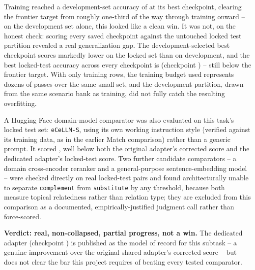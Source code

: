 \documentclass{article}
\newcommand{\code}[1]{\texttt{#1}}
\begin{document}
Training reached a development-set accuracy of \FunctionalAdapterDevBest{} at its best checkpoint, clearing the frontier target from roughly one-third of the way through training onward -- on the development set alone, this looked like a clean win. It was not, on the honest check: scoring every saved checkpoint against the untouched locked test partition revealed a real generalization gap. The development-selected best checkpoint scores markedly lower on the locked set than on development, and the best locked-test accuracy across every checkpoint is \FunctionalAdapterLockedBest{} (checkpoint \FunctionalAdapterBestCheckpoint{}) -- still below the frontier target. With only \FunctionalAdapterTrainRows{} training rows, the training budget used represents dozens of passes over the same small set, and the development partition, drawn from the same scenario bank as training, did not fully catch the resulting overfitting.

A Hugging Face domain-model comparator was also evaluated on this task's locked test set: \code{eCeLLM-S}, using its own working instruction style (verified against its training data, as in the earlier Match comparison) rather than a generic prompt. It scored \FunctionalEcellmLockedAcc{}, well below both the original adapter's corrected score and the dedicated adapter's locked-test score. Two further candidate comparators -- a domain cross-encoder reranker and a general-purpose sentence-embedding model -- were checked directly on real locked-test pairs and found architecturally unable to separate \code{complement} from \code{substitute} by any threshold, because both measure topical relatedness rather than relation type; they are excluded from this comparison as a documented, empirically-justified judgment call rather than force-scored.

\textbf{Verdict: real, non-collapsed, partial progress, not a win.} The dedicated adapter (checkpoint \FunctionalAdapterBestCheckpoint{}) is published as the model of record for this subtask -- a genuine improvement over the original shared adapter's corrected score -- but does not clear the bar this project requires of beating every tested comparator.
\end{document}
